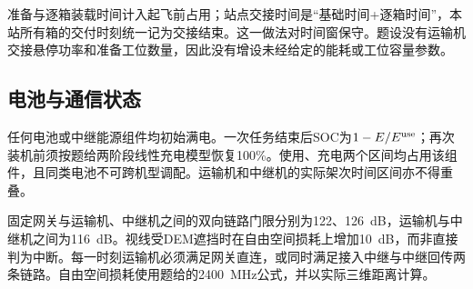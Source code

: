 准备与逐箱装载时间计入起飞前占用；站点交接时间是“基础时间+逐箱时间”，本站所有箱的交付时刻统一记为交接结束。这一做法对时间窗保守。题设没有运输机交接悬停功率和准备工位数量，因此没有增设未经给定的能耗或工位容量参数。

\subsection{电池与通信状态}

任何电池或中继能源组件均初始满电。一次任务结束后SOC为$1-E/E^{\rm use}$；再次装机前须按题给两阶段线性充电模型恢复100\%。使用、充电两个区间均占用该组件，且同类电池不可跨机型调配。运输机和中继机的实际架次时间区间亦不得重叠。

固定网关与运输机、中继机之间的双向链路门限分别为122、126~dB，运输机与中继机之间为116~dB。视线受DEM遮挡时在自由空间损耗上增加10~dB，而非直接判为中断。每一时刻运输机必须满足网关直连，或同时满足接入中继与中继回传两条链路。自由空间损耗使用题给的2400~MHz公式，并以实际三维距离计算\cite{itur}。
